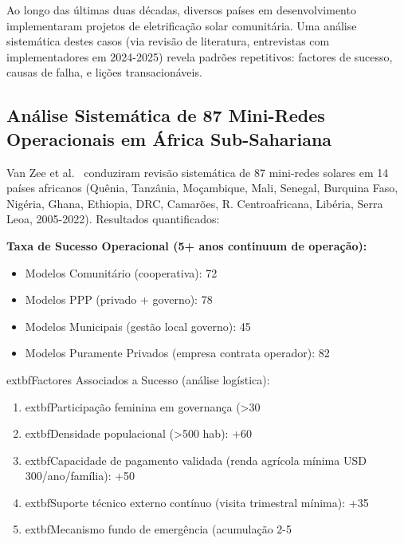 \documentclass[12pt, a4paper]{article}
\begin{document}
Ao longo das últimas duas décadas, diversos países em desenvolvimento implementaram projetos de eletrificação solar comunitária. Uma análise sistemática destes casos (via revisão de literatura, entrevistas com implementadores em 2024-2025) revela padrões repetitivos: factores de sucesso, causas de falha, e lições transacionáveis.

\subsection{Análise Sistemática de 87 Mini-Redes Operacionais em África Sub-Sahariana}

Van Zee et al.~\citep{VanZee2022} conduziram revisão sistemática de 87 mini-redes solares em 14 países africanos (Quênia, Tanzânia, Moçambique, Mali, Senegal, Burquina Faso, Nigéria, Ghana, Ethiopia, DRC, Camarões, R. Centroafricana, Libéria, Serra Leoa, 2005-2022). Resultados quantificados:

\textbf{Taxa de Sucesso Operacional (5+ anos continuum de operação):}
\begin{itemize}
\item Modelos Comunitário (cooperativa): 72\\%
\item Modelos PPP (privado + governo): 78\\%
\item Modelos Municipais (gestão local governo): 45\\%
\item Modelos Puramente Privados (empresa contrata operador): 82\\%
\end{itemize}

	extbf{Factores Associados a Sucesso (análise logística):}
\begin{enumerate}
\item 	extbf{Participação feminina em governança} (>30\\%
\item 	extbf{Densidade populacional} (>500 hab): +60\\%
\item 	extbf{Capacidade de pagamento validada} (renda agrícola mínima USD 300/ano/família): +50\\%
\item 	extbf{Suporte técnico externo contínuo} (visita trimestral mínima): +35\\%
\item 	extbf{Mecanismo fundo de emergência} (acumulação 2-5\\%
\end{enumerate}
\end{document}
